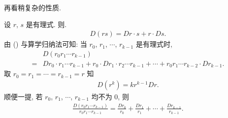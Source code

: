 再看稍复杂的性质.

\begin{proposition}
    设 $r$, $s$ 是有理式. 则.
    \begin{align*}
        D(rs) = Dr \cdot s + r \cdot Ds. \tag*{(\myStar)}
    \end{align*}
    由 (\myStar) 与算学归纳法可知: 当 $r_0$, $r_1$, $\cdots$, $r_{k-1}$ 是有理式时,
    \begin{align*}
             & D(r_0 r_1 \cdots r_{k-1})                                                                                                 \\
        = {} & Dr_0 \cdot r_1 \cdots r_{k-1} + r_0 \cdot Dr_1 \cdot r_2 \cdots r_{k-1} + \cdots + r_0 r_1 \cdots r_{k-2} \cdot Dr_{k-1}.
    \end{align*}
    取 $r_0 = r_1 = \cdots = r_{k-1} = r$ 知
    \begin{align*}
        D(r^k) = kr^{k-1} Dr.
    \end{align*}
    顺便一提, 若 $r_0$, $r_1$, $\cdots$, $r_{k-1}$ 均不为 $0$, 则
    \begin{align*}
        \frac{D(r_0 r_1 \cdots r_{k-1})}{r_0 r_1 \cdots r_{k-1}} = \frac{Dr_0}{r_0} + \frac{Dr_1}{r_1} + \cdots + \frac{Dr_{k-1}}{r_{k-1}}.
    \end{align*}
\end{proposition}

